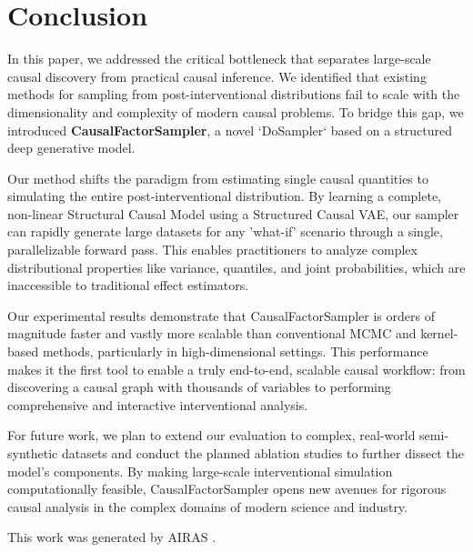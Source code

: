 \documentclass{article} %
\begin{document}
\section{Conclusion}
\label{sec:conclusion}
In this paper, we addressed the critical bottleneck that separates large-scale causal discovery from practical causal inference. We identified that existing methods for sampling from post-interventional distributions fail to scale with the dimensionality and complexity of modern causal problems. To bridge this gap, we introduced \textbf{CausalFactorSampler}, a novel `DoSampler` based on a structured deep generative model.

Our method shifts the paradigm from estimating single causal quantities to simulating the entire post-interventional distribution. By learning a complete, non-linear Structural Causal Model using a Structured Causal VAE, our sampler can rapidly generate large datasets for any 'what-if' scenario through a single, parallelizable forward pass. This enables practitioners to analyze complex distributional properties like variance, quantiles, and joint probabilities, which are inaccessible to traditional effect estimators.

Our experimental results demonstrate that CausalFactorSampler is orders of magnitude faster and vastly more scalable than conventional MCMC and kernel-based methods, particularly in high-dimensional settings. This performance makes it the first tool to enable a truly end-to-end, scalable causal workflow: from discovering a causal graph with thousands of variables to performing comprehensive and interactive interventional analysis.

For future work, we plan to extend our evaluation to complex, real-world semi-synthetic datasets and conduct the planned ablation studies to further dissect the model's components. By making large-scale interventional simulation computationally feasible, CausalFactorSampler opens new avenues for rigorous causal analysis in the complex domains of modern science and industry.

This work was generated by \textsc{AIRAS} \citep{airas2025}.



\end{document}

